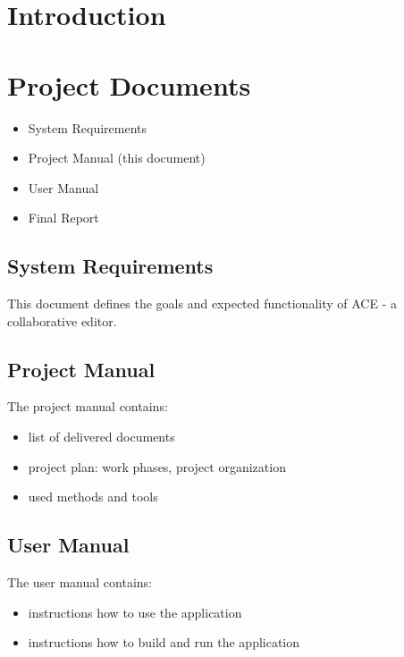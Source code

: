 \documentclass[11pt,a4paper]{article}
\begin{document}


\section{Introduction}

\section{Project Documents}

\begin{itemize}
 \item System Requirements
 \item Project Manual (this document)
 \item User Manual
 \item Final Report
\end{itemize}

\subsection{System Requirements}
This document defines the goals and expected functionality of ACE - a collaborative editor.

\subsection{Project Manual}
The project manual contains:
\begin{itemize}
 \item list of delivered documents
 \item project plan: work phases, project organization
 \item used methods and tools
\end{itemize}

\subsection{User Manual}
The user manual contains:
\begin{itemize}
 \item instructions how to use the application
 \item instructions how to build and run the application
\end{itemize}
\end{document}
